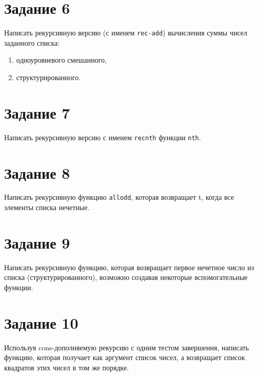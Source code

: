 
\section{Задание 6}

Написать рекурсивную версию (с именем \texttt{rec-add}) вычисления суммы чисел заданного списка:
\begin{enumerate}[label=\alph*)]
	\item одноуровневого смешанного,
	\item структурированного.
\end{enumerate}


\section{Задание 7}

Написать рекурсивную версию с именем \texttt{recnth} функции \texttt{nth}.


\section{Задание 8}

Написать рекурсивную функцию \texttt{allodd}, которая возвращает t, когда все элементы списка нечетные.


\section{Задание 9}

Написать рекурсивную функцию, которая возвращает первое нечетное число из списка (структурированного), возможно создавая некоторые вспомогательные функции.


\section{Задание 10}

Используя cons-дополняемую рекурсию с одним тестом завершения, написать функцию, которая получает как аргумент список чисел, а возвращает список квадратов этих чисел в том же порядке.

